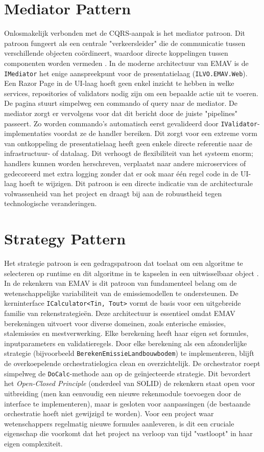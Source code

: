\section{Mediator Pattern}
Onlosmakelijk verbonden met de CQRS-aanpak is het mediator patroon. 
Dit patroon fungeert als een centrale "verkeersleider" die de communicatie tussen verschillende objecten coördineert, waardoor directe koppelingen tussen componenten worden vermeden \autocite{gof1994}. 
In de moderne architectuur van EMAV is de \texttt{IMediator} het enige aanspreekpunt voor de presentatielaag (\texttt{ILVO.EMAV.Web}).
Een Razor Page in de UI-laag hoeft geen enkel inzicht te hebben in welke services, repositories of validators nodig zijn om een bepaalde actie uit te voeren. 
De pagina stuurt simpelweg een commando of query naar de mediator. 
De mediator zorgt er vervolgens voor dat dit bericht door de juiste "pipelines" passeert. 
Zo worden commando's automatisch eerst gevalideerd door \texttt{IValidator}-implementaties voordat ze de handler bereiken.
Dit zorgt voor een extreme vorm van ontkoppeling \: de presentatielaag heeft geen enkele directe referentie naar de infrastructuur- of datalaag. 
Dit verhoogt de flexibiliteit van het systeem enorm; handlers kunnen worden herschreven, verplaatst naar andere microservices of gedecoreerd met extra logging zonder dat er ook maar één regel code in de UI-laag hoeft te wijzigen. 
Dit patroon is een directe indicatie van de architecturale volwassenheid van het project en draagt bij aan de robuustheid tegen technologische veranderingen.
\section{Strategy Pattern}
Het strategie patroon is een gedragspatroon dat toelaat om een algoritme te selecteren op runtime en dit algoritme in te kapselen in een uitwisselbaar object \autocite{gof1994}. 
In de rekenkern van EMAV is dit patroon van fundamenteel belang om de wetenschappelijke variabiliteit van de emissiemodellen te ondersteunen. 
De kerninterface \texttt{ICalculator<Tin, Tout>} vormt de basis voor een uitgebreide familie van rekenstrategieën.
Deze architectuur is essentieel omdat EMAV berekeningen uitvoert voor diverse domeinen, zoals enterische emissies, stalemissies en mestverwerking. 
Elke berekening heeft haar eigen set formules, inputparameters en validatieregels. 
Door elke berekening als een afzonderlijke strategie (bijvoorbeeld \texttt{BerekenEmissieLandbouwbodem}) te implementeren, blijft de overkoepelende orchestratielogica clean en overzichtelijk. 
De orchestrator roept simpelweg de \texttt{DoCalc}-methode aan op de geïnjecteerde strategie.
Dit bevordert het \textit{Open-Closed Principle} (onderdeel van SOLID)\: de rekenkern staat open voor uitbreiding (men kan eenvoudig een nieuwe rekenmodule toevoegen door de interface te implementeren), maar is gesloten voor aanpassingen (de bestaande orchestratie hoeft niet gewijzigd te worden). 
Voor een project waar wetenschappers regelmatig nieuwe formules aanleveren, is dit een cruciale eigenschap die voorkomt dat het project na verloop van tijd "vastloopt" in haar eigen complexiteit.
